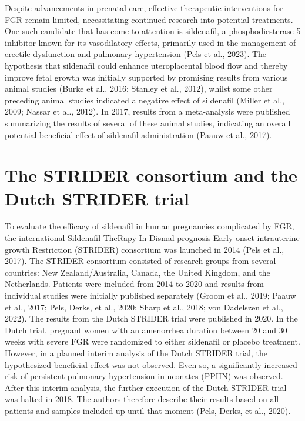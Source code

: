 \documentclass[authordate, reflection]{jote-new-article}
\begin{document}
	Despite advancements in prenatal care, effective therapeutic interventions for FGR remain limited, necessitating continued research into potential treatments. One such candidate that has come to attention is sildenafil, a phosphodiesterase-5 inhibitor known for its vasodilatory effects, primarily used in the management of erectile dysfunction and pulmonary hypertension (Pels et al., 2023). The hypothesis that sildenafil could enhance uteroplacental blood flow and thereby improve fetal growth was initially supported by promising results from various animal studies (Burke et al., 2016; Stanley et al., 2012), whilst some other preceding animal studies indicated a negative effect of sildenafil (Miller et al., 2009; Nassar et al., 2012). In 2017, results from a meta-analysis were published summarizing the results of several of these animal studies, indicating an overall potential beneficial effect of sildenafil administration (Paauw et al., 2017).




	




	\section{The STRIDER consortium and the Dutch STRIDER trial}



	To evaluate the efficacy of sildenafil in human pregnancies complicated by FGR, the international Sildenafil TheRapy In Dismal prognosis Early-onset intrauterine growth Restriction (STRIDER) consortium was launched in 2014 (Pels et al., 2017). The STRIDER consortium consisted of research groups from several countries: New Zealand/Australia, Canada, the United Kingdom, and the Netherlands. Patients were included from 2014 to 2020 and results from individual studies were initially published separately (Groom et al., 2019; Paauw et al., 2017; Pels, Derks, et al., 2020; Sharp et al., 2018; von Dadelszen et al., 2022). The results from the Dutch STRIDER trial were published in 2020. In the Dutch trial, pregnant women with an amenorrhea duration between 20 and 30 weeks with severe FGR were randomized to either sildenafil or placebo treatment. However, in a planned interim analysis of the Dutch STRIDER trial, the hypothesized beneficial effect was not observed. Even so, a significantly increased risk of persistent pulmonary hypertension in neonates (PPHN) was observed. After this interim analysis, the further execution of the Dutch STRIDER trial was halted in 2018. The authors therefore describe their results based on all patients and samples included up until that moment (Pels, Derks, et al., 2020).
\end{document}

